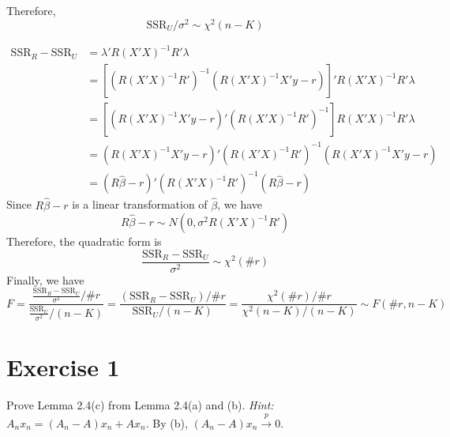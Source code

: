\documentclass[12pt, letterpaper, onecolumn]{exam}
\begin{document}
\begin{solution}
    Therefore,
    \[
        \text{SSR}_{U}/\sigma^{2}\sim \chi^{2}(n-K)
    \]

    \begin{align*}
        \text{SSR}_{R}- \text{SSR}_{U} & = \lambda'R(X'X)^{-1}R'\lambda                                   \\
                                       & =[(R(X'X)^{-1}R')^{-1}(R(X'X)^{-1}X'y - r)]'R(X'X)^{-1}R'\lambda \\
                                       & =[(R(X'X)^{-1}X'y - r)'(R(X'X)^{-1}R')^{-1}]R(X'X)^{-1}R'\lambda \\
                                       & =(R(X'X)^{-1}X'y - r)'(R(X'X)^{-1}R')^{-1}(R(X'X)^{-1}X'y - r)   \\
                                       & =(R\hat{\beta}- r)'(R(X'X)^{-1}R')^{-1}(R\hat{\beta}- r)
    \end{align*}
    Since $R\hat{\beta}- r$ is a linear transformation of $\hat{\beta}$, we
    have
    \[
        R\hat{\beta}- r \sim N(0, \sigma^{2}R(X'X)^{-1}R')
    \]
    Therefore, the quadratic form is
    \[
        \frac{\text{SSR}_{R}- \text{SSR}_{U}}{\sigma^{2}}\sim \chi^{2}(\#r)
    \]
    Finally, we have
    \[
        F = \frac{\frac{\text{SSR}_{R}- \text{SSR}_{U}}{\sigma^{2}}/\#r}{\frac{\text{SSR}_{U}}{\sigma^{2}}/(n-K)}
        = \frac{(\text{SSR}_{R}- \text{SSR}_{U})/\#r}{\text{SSR}_{U}/(n - K)}
        = \frac{\chi^{2}(\#r)/\#r}{\chi^{2}(n-K)/(n-K)}\sim F(\#r, n-K)
    \]
\end{solution}

\section*{Exercise 1}

Prove Lemma 2.4(c) from Lemma 2.4(a) and (b). \textit{Hint:} $A_{n}x_{n}= ( A
        _{n}- A)x_{n}+ A x_{n}$. By (b), $(A_{n}- A)x_{n}\xrightarrow{p}0$.
\end{document}
